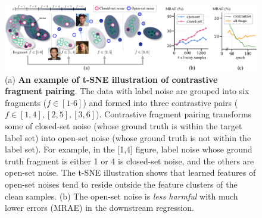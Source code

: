 \documentclass{article}
\def\ie{\textit{i.e}., } \def\Ie{\textit{I.e}., }
\theoremstyle{plain}
\theoremstyle{definition}
\theoremstyle{remark}
\begin{document}
\begin{figure}[t]
\begin{center}
\centerline{
\includegraphics[width=\textwidth]{imgs/figure_1_neurips.pdf}
}
\vskip -0.15in
\caption{
(a) \textbf{An example of t-SNE illustration of contrastive fragment pairing}. 
The data with label noise are grouped into six fragments ($f\in[1\text{-}6]$) and formed into three contrastive pairs ($f\in[1, 4], [2, 5], [3, 6]$). 
Contrastive fragment pairing transforms some of \textcolor[HTML]{E73359}{closed-set noise} (whose ground truth is within the target label set) into \textcolor[HTML]{0000F5}{open-set noise} (whose ground truth is not within the label set).
For example, in the [1,4] figure, label noise whose ground truth fragment is either 1 or 4 is closed-set noise, and the others are open-set noise.
The t-SNE illustration shows that learned features of open-set noises tend to reside outside the feature clusters of the clean samples.
(b) %
The open-set noise is \textit{less harmful} with much lower errors (MRAE) in the downstream regression.
}
\end{center}
\end{figure}
\end{document}
